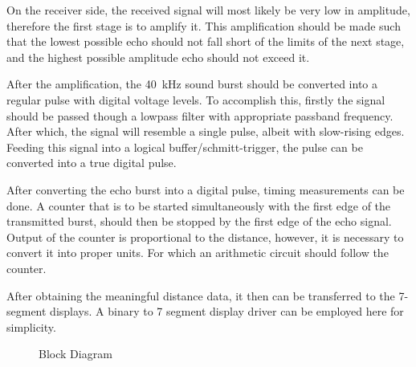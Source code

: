 \documentclass[12pt, a4paper]{article}
\begin{document}
    \pagebreak
    On the receiver side, the received signal will most likely be very low in amplitude, therefore the first stage is to amplify it. This amplification should be made such that the lowest possible echo should not fall short of the limits of the next stage, and the highest possible amplitude echo should not exceed it.
    
    \bigskip
    After the amplification, the \SI{40}{\kilo\hertz} sound burst should be converted into a regular pulse with digital voltage levels. To accomplish this, firstly the signal should be passed though a lowpass filter with appropriate passband frequency. After which, the signal will resemble a single pulse, albeit with slow-rising edges. Feeding this signal into a logical buffer/schmitt-trigger, the pulse can be converted into a true digital pulse. 

    \bigskip
    After converting the echo burst into a digital pulse, timing measurements can be done. A counter that is to be started simultaneously with the first edge of the transmitted burst, should then be stopped by the first edge of the echo signal. Output of the counter is proportional to the distance, however, it is necessary to convert it into proper units. For which an arithmetic circuit should follow the counter.

    \bigskip
    After obtaining the meaningful distance data, it then can be transferred to the 7-segment displays. A binary to 7 segment display driver can be employed here for simplicity.

    \pagebreak
    \begin{landscape}\centering
        \vspace*{1.8cm}
        \begin{figure}[H]\centering
            \caption{Block Diagram}
        \end{figure}
    \end{landscape}
    \vfill
    \pagebreak
\end{document}

